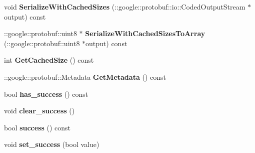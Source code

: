 \begin{DoxyCompactItemize}
\item 
\hypertarget{classSimpleChat_1_1GenericChatResponse_a5bbfac4cb84098769417c5ebf7b8a6a5}{void {\bfseries Serialize\-With\-Cached\-Sizes} (\-::google\-::protobuf\-::io\-::\-Coded\-Output\-Stream $\ast$output) const }\label{classSimpleChat_1_1GenericChatResponse_a5bbfac4cb84098769417c5ebf7b8a6a5}

\item 
\hypertarget{classSimpleChat_1_1GenericChatResponse_a410b38778b5e7cd91400c8d088211427}{\-::google\-::protobuf\-::uint8 $\ast$ {\bfseries Serialize\-With\-Cached\-Sizes\-To\-Array} (\-::google\-::protobuf\-::uint8 $\ast$output) const }\label{classSimpleChat_1_1GenericChatResponse_a410b38778b5e7cd91400c8d088211427}

\item 
\hypertarget{classSimpleChat_1_1GenericChatResponse_a692cbfe2c4b4a38b6dd19b63748aaa76}{int {\bfseries Get\-Cached\-Size} () const }\label{classSimpleChat_1_1GenericChatResponse_a692cbfe2c4b4a38b6dd19b63748aaa76}

\item 
\hypertarget{classSimpleChat_1_1GenericChatResponse_adf50813e8fe7ae8b49e0447b5a63931e}{\-::google\-::protobuf\-::\-Metadata {\bfseries Get\-Metadata} () const }\label{classSimpleChat_1_1GenericChatResponse_adf50813e8fe7ae8b49e0447b5a63931e}

\item 
\hypertarget{classSimpleChat_1_1GenericChatResponse_a3d47070052c5365722bd691ac9765934}{bool {\bfseries has\-\_\-success} () const }\label{classSimpleChat_1_1GenericChatResponse_a3d47070052c5365722bd691ac9765934}

\item 
\hypertarget{classSimpleChat_1_1GenericChatResponse_a6454d5a3dbf1a65e3278fb92dd7e8793}{void {\bfseries clear\-\_\-success} ()}\label{classSimpleChat_1_1GenericChatResponse_a6454d5a3dbf1a65e3278fb92dd7e8793}

\item 
\hypertarget{classSimpleChat_1_1GenericChatResponse_a1b8a7a5eb65cc06bc202e56b28624444}{bool {\bfseries success} () const }\label{classSimpleChat_1_1GenericChatResponse_a1b8a7a5eb65cc06bc202e56b28624444}

\item 
\hypertarget{classSimpleChat_1_1GenericChatResponse_a616a4c030969288563569cc0676ae7c3}{void {\bfseries set\-\_\-success} (bool value)}\label{classSimpleChat_1_1GenericChatResponse_a616a4c030969288563569cc0676ae7c3}


\end{DoxyCompactItemize}
